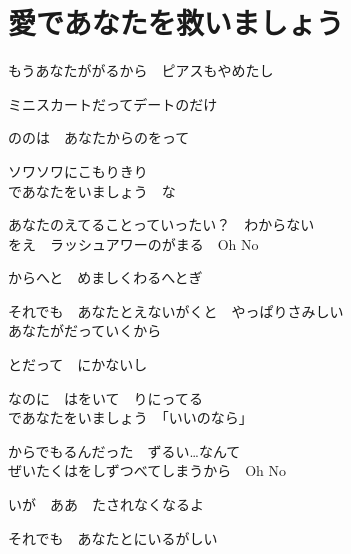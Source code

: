 \section{ 愛であなたを救いましょう}
\large{

もうあなたががるから　ピアスもやめたし

ミニスカートだってデートのだけ

ののは　あなたからのをって

ソワソワにこもりきり
\\

であなたをいましょう　な

あなたのえてることっていったい？　わからない
\\

をえ　ラッシュアワーのがまる　Oh No

からへと　めましくわるへとぎ

それでも　あなたとえないがくと　やっぱりさみしい
\\

あなたがだっていくから

とだって　にかないし

なのに　はをいて　りにってる
\\

であなたをいましょう　「いいのなら」

からでもるんだった　ずるい…なんて
\\

ぜいたくはをしずつべてしまうから　Oh No

いが　ああ　たされなくなるよ

それでも　あなたとにいるがしい

}